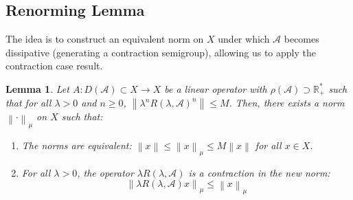 \documentclass[12pt, oneside]{book}
\newtheorem{lemma}{Lemma}[section]
\newcommand{\norm}[1]{\left\lVert#1\right\rVert}
\newcommand{\A}{\mathscr{A}}
\begin{document}
\subsection{Renorming Lemma}
The idea is to construct an equivalent norm on $X$ under which $\A$ becomes dissipative (generating a contraction semigroup), allowing us to apply the contraction case result.

\begin{lemma} \label{re:norm}
	Let $A: D(\A) \subset X \to X$ be a linear operator with $\rho(\A) \supset \mathbb{R}_{+}^{*}$ such that for all $\lambda > 0$ and $n \ge 0$, $\norm{\lambda^n R(\lambda, \A)^n} \le M$.
	Then, there exists a norm $\norm{\cdot}_\mu$ on $X$ such that:
\begin{enumerate}
	\item The norms are equivalent: $\norm{x} \le \norm{x}_\mu \le M \norm{x}$ for all $x \in X$.
\item For all $\lambda > 0$, the operator $\lambda R(\lambda, \A)$ is a contraction in the new norm:
$$
\norm{\lambda R(\lambda, \A) x}_\mu \le \norm{x}_\mu
$$
\end{enumerate}
\end{lemma}
\end{document}
